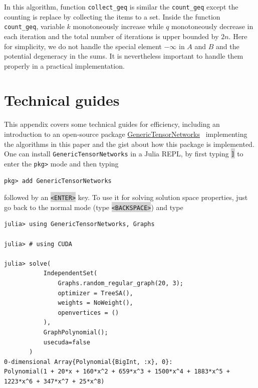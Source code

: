 \documentclass[review,supplement,onefignum,onetabnum]{siamart190516}
\begin{document}
In this algorithm, function \texttt{collect\_geq} is similar the \texttt{count\_geq} except the counting is replace by collecting the items to a set.
Inside the function \texttt{count\_geq}, variable $k$ monotoneously increase while $q$ monotoneously decrease in each iteration and
the total number of iterations is upper bounded by $2n$.
Here for simplicity, we do not handle the special element $-\infty$ in $A$ and $B$ and the potential degeneracy in the sums.
It is nevertheless important to handle them properly in a practical implementation.

\section{Technical guides}\label{sec:technical}

This appendix covers some technical guides for efficiency, including an introduction to an open-source package \href{https://github.com/QuEraComputing/GenericTensorNetworks.jl}{GenericTensorNetworks}~\cite{GenericTensorNetworks} implementing the algorithms in this paper and the gist about how this package is implemented.
One can install \texttt{GenericTensorNetworks} in a Julia REPL, by first typing \colorbox{lightgray}{\texttt{]}} to enter the \texttt{pkg>} mode and then typing
\begin{lstlisting}
pkg> add GenericTensorNetworks
\end{lstlisting}
followed by an \colorbox{lightgray}{\texttt{<ENTER>}} key.
To use it for solving solution space properties, just go back to the normal mode (type \colorbox{lightgray}{\texttt{<BACKSPACE>}}) and type

\begin{lstlisting}
julia> using GenericTensorNetworks, Graphs

julia> # using CUDA

julia> solve(
           IndependentSet(
               Graphs.random_regular_graph(20, 3);
               optimizer = TreeSA(),
               weights = NoWeight(),
               openvertices = ()
           ),
           GraphPolynomial();
           usecuda=false
       )
0-dimensional Array{Polynomial{BigInt, :x}, 0}:
Polynomial(1 + 20*x + 160*x^2 + 659*x^3 + 1500*x^4 + 1883*x^5 + 1223*x^6 + 347*x^7 + 25*x^8)
\end{lstlisting}
\end{document}
